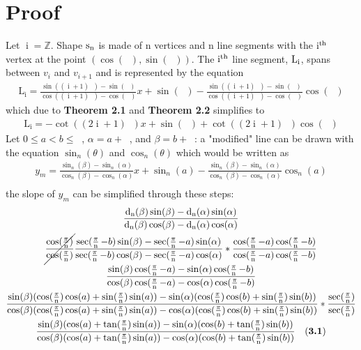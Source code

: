 \documentclass[11pt]{article}
\DeclareMathOperator{\custd}{\mathrm{d}_n}
\DeclareMathOperator{\custi}{\mathrm{i}}
\DeclareMathOperator{\period}{\frac{2\pi}{n}}
\DeclareMathOperator{\hp}{\frac{\pi}{n}}
\DeclareMathOperator{\iperiod}{\custi\frac{2\pi}{n}}
\begin{document}
\section{Proof}
Let \(\custi=\mathbb{Z}\). Shape \(\rm s_n\) is made of n vertices and n line segments with the \(\rm i^{th}\) vertex at the point \((\cos(\iperiod), \sin(\iperiod))\). The \(\rm i^{th}\) line segment, \(\rm L_i\), spans between \(v_i\) and \(v_{i+1}\) and is represented by the equation
\begin{gather*}
\mathrm{L_i}=\frac{\sin((\custi+1)\period)-\sin(\iperiod)}{\cos((\custi+1)\period)-\cos(\iperiod)}x+\sin(\iperiod)-\frac{\sin((\custi+1)\period)-\sin(\iperiod)}{\cos((\custi+1)\period)-\cos(\iperiod)}\cos(\iperiod)
\end{gather*}
which due to \textbf{Theorem 2.1} and \textbf{Theorem 2.2} simplifies to 
\begin{gather*}
\mathrm{L_i}=-\cot((2\custi+1)\hp)x+\sin(\iperiod)+\cot((2\custi+1)\hp)\cos(\iperiod)
\end{gather*}
Let \(0\leq a<b\leq\period\), \(\alpha=a+\iperiod\), and \(\beta=b+\iperiod\): a "modified" line can be drawn with the equation \(\sin_n(\theta)\) and \(\cos_n(\theta)\) which would be written as
\begin{gather*}
y_m=\frac{\sin_n(\beta)-\sin_n(\alpha)}{\cos_n(\beta)-\cos_n(\alpha)}x+\sin_n(a)-\frac{\sin_n(\beta)-\sin_n(\alpha)}{\cos_n(\beta)-\cos_n(\alpha)}\cos_n(a)\\
\end{gather*}
the slope of \(y_m\) can be simplified through these steps:
\begin{gather*}
\frac{\custd(\beta)\sin(\beta)-\custd(\alpha)\sin(\alpha)}{\custd(\beta)\cos(\beta)-\custd(\alpha)\cos(\alpha)}\\
\cancel{\frac{\cos(\hp)}{\cos(\hp)}}\frac{\sec(\hp-b)\sin(\beta)-\sec(\hp-a)\sin(\alpha)}{\sec(\hp-b)\cos(\beta)-\sec(\hp-a)\cos(\alpha)}*\frac{\cos(\hp-a)\cos(\hp-b)}{\cos(\hp-a)\cos(\hp-b)}\\
\frac{\sin(\beta)\cos(\hp-a)-\sin(\alpha)\cos(\hp-b)}{\cos(\beta)\cos(\hp-a)-\cos(\alpha)\cos(\hp-b)}\\
\frac{\sin(\beta)(\cos(\hp)\cos(a)+\sin(\hp)\sin(a))-\sin(\alpha)(\cos(\hp)\cos(b)+\sin(\hp)\sin(b))}{\cos(\beta)(\cos(\hp)\cos(a)+\sin(\hp)\sin(a))-\cos(\alpha)(\cos(\hp)\cos(b)+\sin(\hp)\sin(b))}*\frac{\sec(\hp)}{\sec(\hp)}\\
\frac{\sin(\beta)(\cos(a)+\tan(\hp)\sin(a))-\sin(\alpha)(\cos(b)+\tan(\hp)\sin(b))}{\cos(\beta)(\cos(a)+\tan(\hp)\sin(a))-\cos(\alpha)(\cos(b)+\tan(\hp)\sin(b))} \ \ \ \mathrm{(\textbf{3.1})}
\end{gather*}
\end{document}

